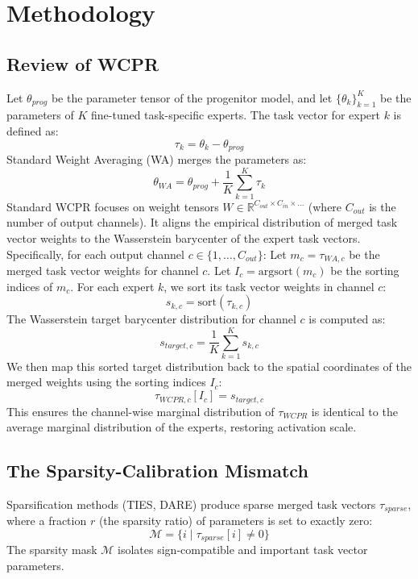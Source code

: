 \documentclass{article}
\theoremstyle{plain}
\theoremstyle{definition}
\theoremstyle{remark}
\begin{document}
\section{Methodology}
\label{sec:method}

\subsection{Review of WCPR}
Let $\theta_{prog}$ be the parameter tensor of the progenitor model, and let $\{\theta_k\}_{k=1}^K$ be the parameters of $K$ fine-tuned task-specific experts. The task vector for expert $k$ is defined as:
\begin{equation}
    \tau_k = \theta_k - \theta_{prog}
\end{equation}
Standard Weight Averaging (WA) merges the parameters as:
\begin{equation}
    \theta_{WA} = \theta_{prog} + \frac{1}{K}\sum_{k=1}^K \tau_k
\end{equation}
Standard WCPR \cite{submission9} focuses on weight tensors $W \in \mathbb{R}^{C_{out} \times C_{in} \times \dots}$ (where $C_{out}$ is the number of output channels). It aligns the empirical distribution of merged task vector weights to the Wasserstein barycenter of the expert task vectors. Specifically, for each output channel $c \in \{1, \dots, C_{out}\}$:
Let $m_c = \tau_{WA, c}$ be the merged task vector weights for channel $c$. Let $I_c = \text{argsort}(m_c)$ be the sorting indices of $m_c$. For each expert $k$, we sort its task vector weights in channel $c$:
\begin{equation}
    s_{k, c} = \text{sort}(\tau_{k, c})
\end{equation}
The Wasserstein target barycenter distribution for channel $c$ is computed as:
\begin{equation}
    s_{target, c} = \frac{1}{K}\sum_{k=1}^K s_{k, c}
\end{equation}
We then map this sorted target distribution back to the spatial coordinates of the merged weights using the sorting indices $I_c$:
\begin{equation}
    \tau_{WCPR, c}[I_c] = s_{target, c}
\end{equation}
This ensures the channel-wise marginal distribution of $\tau_{WCPR}$ is identical to the average marginal distribution of the experts, restoring activation scale.

\subsection{The Sparsity-Calibration Mismatch}
Sparsification methods (TIES, DARE) produce sparse merged task vectors $\tau_{sparse}$, where a fraction $r$ (the sparsity ratio) of parameters is set to exactly zero:
\begin{equation}
    \mathcal{M} = \{i \mid \tau_{sparse}[i] \neq 0\}
\end{equation}
The sparsity mask $\mathcal{M}$ isolates sign-compatible and important task vector parameters. 
\end{document}
